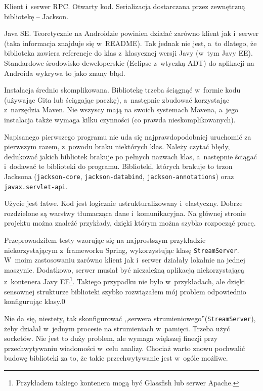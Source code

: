 \begin{description}
Klient i~serwer RPC. Otwarty kod. Serializacja dostarczana przez zewnętrzną bibliotekę -- Jackson.

Java SE.
Teoretycznie na Androidzie powinien działać zarówno klient jak i~serwer (taka informacja znajduje się w~README).
Tak jednak nie jest, a~to dlatego, że biblioteka zawiera referencje do klas z~klasycznej wersji Javy (w~tym Javy EE).
Standardowe środowisko deweloperskie (Eclipse z~wtyczką ADT) do aplikacji na Androida wykrywa to jako znany błąd.

Instalacja średnio skomplikowana.
Bibliotekę trzeba ściągnąć w~formie kodu (używając Gita lub ściągając paczkę), a~następnie zbudować korzystając z~narzędzia Maven.
Nie wszyscy mają na swoich systemach Mavena, a~jego instalacja także wymaga kilku czynności (co prawda nieskomplikowanych).

Napisanego pierwszego programu nie uda się najprawdopodobniej uruchomić za pierwszym razem, z~powodu braku niektórych klas.
Należy czytać błędy, dedukować jakich bibliotek brakuje po pełnych nazwach klas, a~następnie ściągać i~dodawać te biblioteki do programu.
Biblioteki, których brakuje to trzon Jacksona (\texttt{jackson-core}, \texttt{jackson-databind}, \texttt{jackson-annotations}) oraz \texttt{javax.servlet-api}.

Użycie jest łatwe. Kod jest logicznie ustrukturalizowany i~elastyczny.
Dobrze rozdzielone są warstwy tłumacząca dane i~komunikacyjna.
Na głównej stronie projektu można znaleźć przykłady, dzięki którym można szybko rozpocząć pracę.

Przeprowadziłem testy wzorując się na najprostszym przykładzie niekorzystającym z~frameworku Spring, wykorzystując klasę \texttt{StreamServer}.
W~moim zastosowaniu zarówno klient jak i~serwer działały lokalnie na jednej maszynie. Dodatkowo, serwer musiał być niezależną aplikacją niekorzystającą z~kontenera Javy EE\footnote{Przykładem takiego kontenera mogą być Glassfish lub serwer Apache.}.
Takiego przypadku nie było w~przykładach, ale dzięki sensownej strukturze biblioteki szybko rozwiązałem mój problem odpowiednio konfigurując klasy.0

Nie da się, niestety, tak skonfigurować ,,serwera strumieniowego''(\texttt{StreamServer}), żeby działał w~jednym procesie na strumieniach w~pamięci. Trzeba użyć socketów. Nie jest to duży problem, ale wymaga większej finezji przy przechwytywaniu wiadomości w~celu analizy. Chociaż warto znowu pochwalić budowę biblioteki za to, że takie przechwytywanie jest w~ogóle możliwe.


\end{description}
